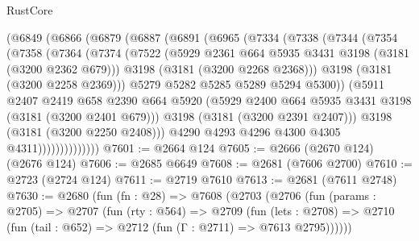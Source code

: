 \begin{lexlean}{RustCore}
\begin{coremodule}
              (@6849
                (@6866
                  (@6879
                    (@6887
                      (@6891
                        (@6965
                          (@7334
                            (@7338
                              (@7344
                                (@7354
                                  (@7358
                                    (@7364
                                      (@7374
                                        (@7522
                                          (@5929
                                            @2361
                                            @664
                                            @5935
                                            @3431
                                            @3198
                                            (@3181 (@3200 @2362 @679)))
                                          @3198
                                          (@3181 (@3200 @2268 @2368)))
                                        @3198
                                        (@3181 (@3200 @2258 @2369)))
                                      @5279
                                      @5282
                                      @5285
                                      @5289
                                      @5294
                                      @5300))
                                  (@5911
                                    @2407
                                    @2419
                                    @658
                                    @2390
                                    @664
                                    @5920
                                    (@5929 @2400 @664 @5935 @3431 @3198 (@3181 (@3200 @2401 @679)))
                                    @3198
                                    (@3181 (@3200 @2391 @2407)))
                                  @3198
                                  (@3181 (@3200 @2250 @2408)))
                                @4290
                                @4293
                                @4296
                                @4300
                                @4305
                                @4311))))))))))))))
@7601 := @2664 @124
@7605 := @2666 (@2670 @124) (@2676 @124)
@7606 := @2685 @6649
@7608 := @2681 (@7606 @2700)
@7610 := @2723 (@2724 @124)
@7611 := @2719 @7610
@7613 := @2681 (@7611 @2748)
@7630 := @2680
    (fun (fn : @28) =>
    @7608
      (@2703
        (@2706
          (fun (params : @2705) =>
          @2707
            (fun (rty : @564) =>
            @2709
              (fun (lets : @2708) =>
              @2710 (fun (tail : @652) => @2712 (fun (Γ : @2711) => @7613 @2795))))))

\end{coremodule}
\end{lexlean}

